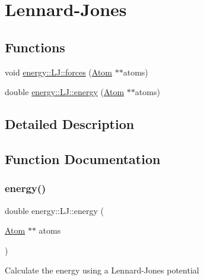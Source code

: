 \hypertarget{group___lennard-_jones}{}\section{Lennard-\/\+Jones}
\label{group___lennard-_jones}
\subsection*{Functions}
\begin{DoxyCompactItemize}
\item 
void \mbox{\hyperlink{group___lennard-_jones_ga964e5b1db9c2f1cfaf64663b2fa92e90}{energy\+::\+L\+J\+::forces}} (\mbox{\hyperlink{class_atom}{Atom}} $\ast$$\ast$atoms)
\item 
double \mbox{\hyperlink{group___lennard-_jones_ga100c4be2b148a0f7f68f6af3dac4135a}{energy\+::\+L\+J\+::energy}} (\mbox{\hyperlink{class_atom}{Atom}} $\ast$$\ast$atoms)
\end{DoxyCompactItemize}


\subsection{Detailed Description}


\subsection{Function Documentation}
\mbox{\label{group___lennard-_jones_ga100c4be2b148a0f7f68f6af3dac4135a}} 
\subsubsection{\texorpdfstring{energy()}{energy()}}
{\footnotesize\ttfamily double energy\+::\+L\+J\+::energy (\begin{DoxyParamCaption}\item[{\mbox{\hyperlink{class_atom}{Atom}} $\ast$$\ast$}]{atoms }\end{DoxyParamCaption})\hspace{0.3cm}{\ttfamily [inline]}}

Calculate the energy using a Lennard-\/\+Jones potential\mbox{\label{group___lennard-_jones_ga964e5b1db9c2f1cfaf64663b2fa92e90}} 
